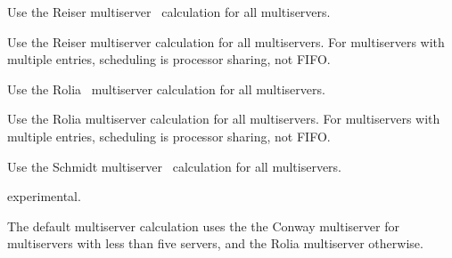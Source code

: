 \begin{description}
\begin{description}
Use the Reiser multiserver~\cite{queue:reiser-79} calculation for all multiservers.
\item[\optarg{reiser-ps}{}]
Use the Reiser multiserver calculation for all multiservers. For multiservers with multiple entries, scheduling is processor sharing, not FIFO. 
\item[\optarg{rolia}{}]
Use the Rolia~\cite{perf:rolia-92,perf:rolia-95-ieeese-mol} multiserver calculation for all multiservers.
\item[\optarg{rolia-ps}{}]
Use the Rolia multiserver calculation for all multiservers. For multiservers with multiple entries, scheduling is processor sharing, not FIFO. 
\item[\optarg{schmidt}{}]
Use the Schmidt multiserver~\cite{queue:schmidt-97} calculation for all multiservers.
\item[\optarg{suri}{}]
experimental.
\end{description}
The default multiserver calculation uses the the Conway multiserver for multiservers with less than five servers, and the Rolia multiserver otherwise.


\end{description}
